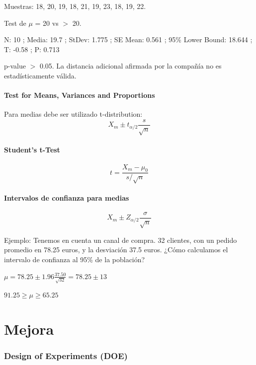 \documentclass[]{article}
\begin{document}
Muestras: 18, 20, 19, 18, 21, 19, 23, 18, 19, 22. 
 
Test de $\mu$ = 20 vs $>$ 20. 

N: 10 ; Media: 19.7 ; StDev: 1.775 ; SE Mean: 0.561 ; 95\% Lower Bound: 18.644 ; T: -0.58 ; P: 0.713 

p-value $>$ 0.05. La distancia adicional afirmada por la compañía no es estadísticamente válida.

\subsection{Test for Means, Variances and Proportions}

Para medias debe ser utilizado t-distribution:
\begin{equation}
X_m \pm t_{\alpha/2}\frac{s}{\sqrt{n}}
\end{equation}

\subsection{Student's t-Test}
\begin{equation}
t = \frac{X_m-\mu_0}{s/\sqrt{n}}
\end{equation}

\subsection{Intervalos de confianza para medias}
\begin{equation}
X_m \pm Z_{\alpha/2} \frac{\sigma}{\sqrt{n}}
\end{equation}

Ejemplo: Tenemos en cuenta un canal de compra. 32 clientes, con un pedido promedio en 78.25 euros, y la desviación 37.5 euros. ¿Cómo calculamos el intervalo de confianza al 95\% de la población? \newline
\begin{center}$\mu = 78.25 \pm 1.96\frac{37.50}{\sqrt{32}} = 78.25 \pm 13$ \end{center} 
\begin{center}$91.25 \geq \mu \geq 65.25 $ \end{center}
\part{Mejora}
\section{Design of Experiments (DOE)}
\end{document}
